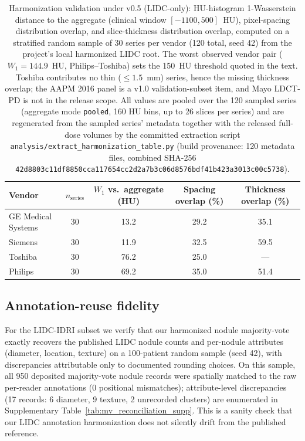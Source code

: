 \documentclass[twoside,11pt]{article}
\begin{document}
\begin{table}[ht]
    \centering
    \small
    \setlength{\tabcolsep}{4pt}
    \begin{tabular}{lcccc}
        \toprule
        Vendor & $n_{\text{series}}$ & $W_1$ vs.\ aggregate (HU) & Spacing overlap (\%) & Thickness overlap (\%) \\
        \midrule
        GE Medical Systems & 30 & 13.2  & 29.2 & 35.1 \\
        Siemens          & 30 & 11.9  & 32.5 & 59.5 \\
        Toshiba          & 30 & 76.2  & 25.0 & --- \\
        Philips          & 30 & 69.2  & 35.0 & 51.4 \\
        \bottomrule
    \end{tabular}
    \caption{Harmonization validation under v0.5 (LIDC-only): HU-histogram 1-Wasserstein distance to the aggregate (clinical window $[-1100, 500]$~HU), pixel-spacing distribution overlap, and slice-thickness distribution overlap, computed on a stratified random sample of 30 series per vendor (120 total, seed 42) from the project's local harmonized LIDC root. The worst observed vendor pair ($W_1 = 144.9$~HU, Philips--Toshiba) sets the 150~HU threshold quoted in the text. Toshiba contributes no thin ($\leq 1.5$~mm) series, hence the missing thickness overlap; the AAPM 2016 panel is a v1.0 validation-subset item, and Mayo LDCT-PD is not in the release scope. All values are pooled over the 120 sampled series (aggregate mode \texttt{pooled}, 160 HU bins, up to 26 slices per series) and are regenerated from the sampled series' metadata together with the released full-dose volumes by the committed extraction script \texttt{analysis/extract\_harmonization\_table.py} (build provenance: 120 metadata files, combined SHA-256 \texttt{42d8803c11df8850cca117654cc2d2a7b3c06d8576bdf41b423a3013c00c5738}).}
    \label{tab:harmonization_v05}
\end{table}

\subsection*{Annotation-reuse fidelity}
For the LIDC-IDRI subset we verify that our harmonized nodule majority-vote exactly recovers the published LIDC nodule counts and per-nodule attributes (diameter, location, texture) on a 100-patient random sample (seed 42), with discrepancies attributable only to documented rounding choices. On this sample, all 950 deposited majority-vote nodule records were spatially matched to the raw per-reader annotations (0 positional mismatches); attribute-level discrepancies (17 records: 6 diameter, 9 texture, 2 unrecorded clusters) are enumerated in Supplementary Table~\ref{tab:mv_reconciliation_supp}. This is a sanity check that our LIDC annotation harmonization does not silently drift from the published reference.
\end{document}
